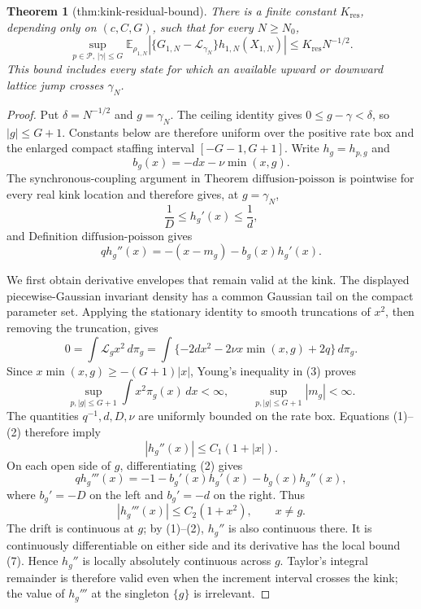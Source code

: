 \documentclass{article}
\newtheorem{theorem}{Theorem}
\begin{document}
\begin{theorem}[thm:kink-residual-bound]\label{thm:kink-residual-bound}
There is a finite constant \(K_{\mathrm{res}}\), depending only on
\((c,C,G)\), such that for every \(N\geq N_0\),
\[
 \sup_{p\in\mathcal P,\,|\gamma|\leq G}
 \mathbb E_{\rho_{1,N}}
 \left|\{G_{1,N}-\mathcal L_{\gamma_N}\}
 h_{1,N}(X_{1,N})\right|
 \leq K_{\mathrm{res}}N^{-1/2}.
\]
This bound includes every state for which an available upward or downward
lattice jump crosses \(\gamma_N\).
\end{theorem}
\begin{proof}
Put \(\delta=N^{-1/2}\) and \(g=\gamma_N\).  The ceiling identity gives \(0\leq g-\gamma<\delta\), so \(|g|\leq G+1\).  Constants below are therefore uniform over the positive rate box and the enlarged compact staffing interval \([-G-1,G+1]\).  Write \(h_g=h_{p,g}\) and
\[
 b_g(x)=-dx-\nu\min(x,g).
\]
The synchronous-coupling argument in Theorem \(\mathrm{diffusion\mbox{-}poisson}\) is pointwise for every real kink location and therefore gives, at \(g=\gamma_N\),
\[
 \frac1D\leq h_g'(x)\leq\frac1d,                              \tag{1}
\]
and Definition \(\mathrm{diffusion\mbox{-}poisson}\) gives
\[
 qh_g''(x)=-(x-m_g)-b_g(x)h_g'(x).                             \tag{2}
\]

We first obtain derivative envelopes that remain valid at the kink.  The displayed piecewise-Gaussian invariant density has a common Gaussian tail on the compact parameter set.  Applying the stationary identity to smooth truncations of \(x^2\), then removing the truncation, gives
\[
 0=\int\mathcal L_gx^2\,d\pi_g
 =\int\{-2dx^2-2\nu x\min(x,g)+2q\}\,d\pi_g.                 \tag{3}
\]
Since \(x\min(x,g)\geq-(G+1)|x|\), Young's inequality in (3) proves
\[
 \sup_{p,|g|\leq G+1}\int x^2\pi_g(x)\,dx<\infty,
 \qquad
 \sup_{p,|g|\leq G+1}|m_g|<\infty.                            \tag{4}
\]
The quantities \(q^{-1},d,D,\nu\) are uniformly bounded on the rate box.  Equations (1)--(2) therefore imply
\[
 |h_g''(x)|\leq C_1(1+|x|).                                   \tag{5}
\]
On each open side of \(g\), differentiating (2) gives
\[
 qh_g'''(x)=-1-b_g'(x)h_g'(x)-b_g(x)h_g''(x),                 \tag{6}
\]
where \(b_g'=-D\) on the left and \(b_g'=-d\) on the right.  Thus
\[
 |h_g'''(x)|\leq C_2(1+x^2),\qquad x\ne g.                    \tag{7}
\]
The drift is continuous at \(g\); by (1)--(2), \(h_g''\) is also continuous there.  It is continuously differentiable on either side and its derivative has the local bound (7).  Hence \(h_g''\) is locally absolutely continuous across \(g\).  Taylor's integral remainder is therefore valid even when the increment interval crosses the kink; the value of \(h_g'''\) at the singleton \(\{g\}\) is irrelevant.


\end{proof}
\end{document}
